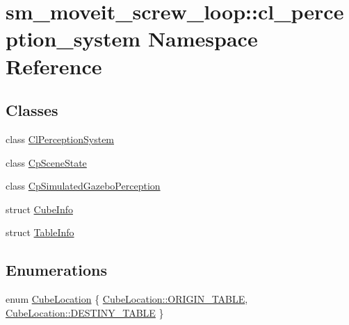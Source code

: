 \hypertarget{namespacesm__moveit__screw__loop_1_1cl__perception__system}{}\section{sm\+\_\+moveit\+\_\+screw\+\_\+loop\+:\+:cl\+\_\+perception\+\_\+system Namespace Reference}
\label{namespacesm__moveit__screw__loop_1_1cl__perception__system}
\subsection*{Classes}
\begin{DoxyCompactItemize}
\item 
class \hyperlink{classsm__moveit__screw__loop_1_1cl__perception__system_1_1ClPerceptionSystem}{Cl\+Perception\+System}
\item 
class \hyperlink{classsm__moveit__screw__loop_1_1cl__perception__system_1_1CpSceneState}{Cp\+Scene\+State}
\item 
class \hyperlink{classsm__moveit__screw__loop_1_1cl__perception__system_1_1CpSimulatedGazeboPerception}{Cp\+Simulated\+Gazebo\+Perception}
\item 
struct \hyperlink{structsm__moveit__screw__loop_1_1cl__perception__system_1_1CubeInfo}{Cube\+Info}
\item 
struct \hyperlink{structsm__moveit__screw__loop_1_1cl__perception__system_1_1TableInfo}{Table\+Info}
\end{DoxyCompactItemize}
\subsection*{Enumerations}
\begin{DoxyCompactItemize}
\item 
enum \hyperlink{namespacesm__moveit__screw__loop_1_1cl__perception__system_a3685ee11048648ccb59214d2341fb8ca}{Cube\+Location} \{ \hyperlink{namespacesm__moveit__screw__loop_1_1cl__perception__system_a3685ee11048648ccb59214d2341fb8caae5ee34c3ef8ec4a46a00a218416c7b1d}{Cube\+Location\+::\+O\+R\+I\+G\+I\+N\+\_\+\+T\+A\+B\+LE}, 
\hyperlink{namespacesm__moveit__screw__loop_1_1cl__perception__system_a3685ee11048648ccb59214d2341fb8caacdc3fdda18904b4a1ac0be036c86f973}{Cube\+Location\+::\+D\+E\+S\+T\+I\+N\+Y\+\_\+\+T\+A\+B\+LE}
 \}
\end{DoxyCompactItemize}


